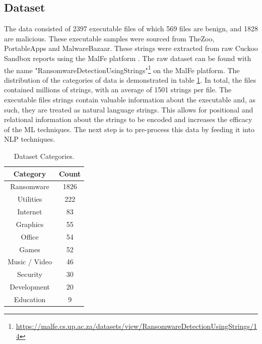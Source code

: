 \documentclass[conference]{IEEEtran}
\begin{document}
\subsection{Dataset}
The data consisted of 2397 executable files of which 569 files are benign, and 1828 are malicious. These executable samples were sourced from TheZoo, PortableApps and MalwareBazaar. These strings were extracted from raw Cuckoo Sandbox reports using the MalFe platform \cite{malfe}. The raw dataset can be found with the name "RansomwareDetectionUsingStrings"\footnote{\url{https://malfe.cs.up.ac.za/datasets/view/RansomwareDetectionUsingStrings/14}} on the MalFe platform. The distribution of the categories of data is demonstrated in table \ref{tab:datasetCat}. In total, the files contained millions of strings, with an average of 1501 strings per file. The executable files strings contain valuable information about the executable and, as such, they are treated as natural language strings. This allows for positional and relational information about the strings to be encoded and increases the efficacy of the ML techniques. The next step is to pre-process this data by feeding it into NLP techniques. 
\begin{table}[H]
 \begin{center}
 \caption{\label{tab:datasetCat} Dataset Categories.}
\begin{tabular}{|c|c|}
 \hline
\textbf{Category} & \textbf{Count} \\\hline 
Ransomware       & 1826 \\\hline
Utilities        & 222 \\\hline
Internet         & 83 \\\hline
Graphics         & 55 \\\hline
Office           & 54 \\\hline
Games            & 52 \\\hline
Music / Video    & 46 \\\hline
Security         & 30 \\\hline
Development      & 20 \\\hline
Education        &  9 \\\hline
\end{tabular}
 \end{center}

\end{table}
\end{document}
